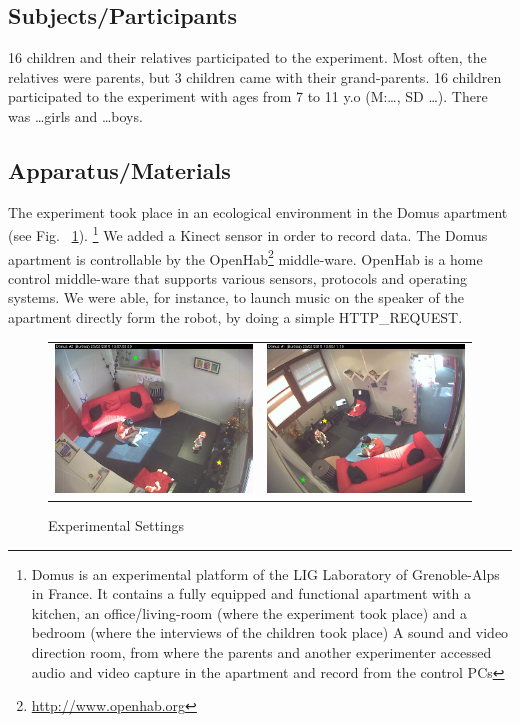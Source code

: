 \documentclass[a4paper,twocolumn]{svjour3}
\begin{document}
\subsection{Subjects/Participants}
16 children and their relatives participated to the experiment. 
Most often, the relatives were parents, but 3 children came with their grand-parents.
16 children participated to the experiment with ages from 7 to 11 y.o (M:\dots, SD \dots).
There was \dots girls and \dots boys. 

\subsection{Apparatus/Materials}
The experiment took place in an ecological environment in the Domus apartment (see Fig. ~\ref{fig:domusroof}).
\footnote{Domus is an experimental platform of the LIG Laboratory of Grenoble-Alps in France.
	It contains a fully equipped and functional apartment with a kitchen, an office/living-room (where the experiment took place) and  a bedroom (where the interviews of the children took place)
	A sound and video direction room, from where the parents and another experimenter accessed audio and video capture in the apartment and record from the control PCs}
We added a Kinect sensor in order to record data. 
The Domus apartment is controllable by the OpenHab\footnote{\url{http://www.openhab.org}} middle-ware. 
OpenHab is a home control middle-ware that supports various sensors, protocols and operating systems. 
We were able, for instance, to launch music on the speaker of the apartment directly form the robot, by doing a simple HTTP\_REQUEST. 
\begin{figure}[h]
	\begin{tabular}{c c}
		\includegraphics[width=0.45\linewidth]{Figures/illustrate/roof1}&
		\includegraphics[width=0.45\linewidth]{Figures/illustrate/roof2}
	\end{tabular}
	\caption{Experimental Settings}
	\label{fig:domusroof}
\end{figure}
\end{document}
